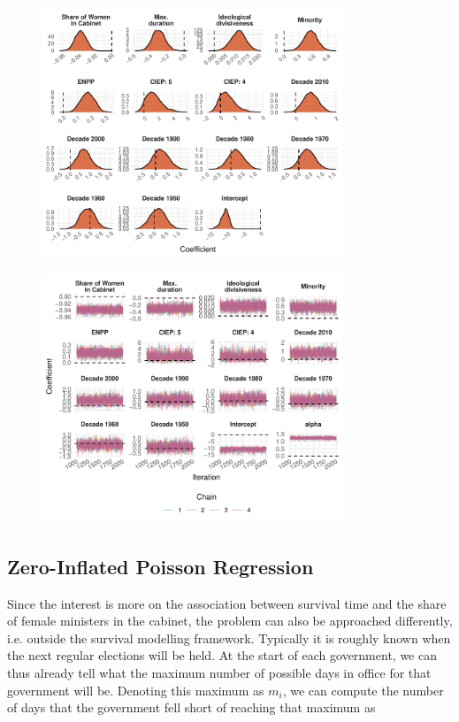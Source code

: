 \begin{figure}
    \centering
    \includegraphics[width = 0.8\textwidth]{figures/fig1_weib_coefplot.pdf}
\end{figure}

\begin{figure}
    \centering
    \includegraphics[width = 0.8\textwidth]{figures/fig2_weib_convergence.pdf}
\end{figure}


\subsection{Zero-Inflated Poisson Regression}
Since the interest is more on the association between survival time and the share of female ministers in the cabinet, the problem can also be approached differently, i.e. outside the survival modelling framework. Typically it is roughly known when the next regular elections will be held. At the start of each government, we can thus already tell what the maximum number of possible days in office for that government will be. Denoting this maximum as $m_i$, we can compute the number of days that the government fell short of reaching that maximum as 

